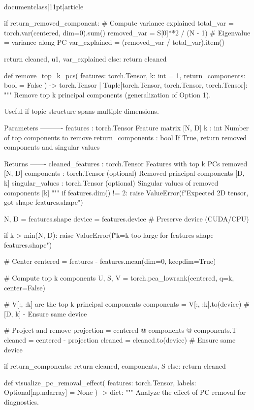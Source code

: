 \\documentclass[11pt]{article}
\begin{document}
\begin{CodeBlock}
{    if return_removed_component:
        # Compute variance explained
        total_var = torch.var(centered, dim=0).sum()
        removed_var = S[0]**2 / (N - 1)  # Eigenvalue = variance along PC
        var_explained = (removed_var / total_var).item()
        
        return cleaned, u1, var_explained
    else:
        return cleaned


def remove_top_k_pcs(
    features: torch.Tensor,
    k: int = 1,
    return_components: bool = False
) -> torch.Tensor | Tuple[torch.Tensor, torch.Tensor, torch.Tensor]:
    """
    Remove top k principal components (generalization of Option 1).
    
    Useful if topic structure spans multiple dimensions.
    
    Parameters
    ----------
    features : torch.Tensor
        Feature matrix [N, D]
    k : int
        Number of top components to remove
    return_components : bool
        If True, return removed components and singular values
    
    Returns
    -------
    cleaned_features : torch.Tensor
        Features with top k PCs removed [N, D]
    components : torch.Tensor (optional)
        Removed principal components [D, k]
    singular_values : torch.Tensor (optional)
        Singular values of removed components [k]
    """
    if features.dim() != 2:
        raise ValueError(f"Expected 2D tensor, got shape {features.shape}")
    
    N, D = features.shape
    device = features.device  # Preserve device (CUDA/CPU)
    
    if k > min(N, D):
        raise ValueError(f"k={k} too large for features shape {features.shape}")
    
    # Center
    centered = features - features.mean(dim=0, keepdim=True)
    
    # Compute top k components
    U, S, V = torch.pca_lowrank(centered, q=k, center=False)
    
    # V[:, :k] are the top k principal components
    components = V[:, :k].to(device)  # [D, k] - Ensure same device
    
    # Project and remove
    projection = centered @ components @ components.T
    cleaned = centered - projection
    cleaned = cleaned.to(device)  # Ensure same device
    
    if return_components:
        return cleaned, components, S
    else:
        return cleaned


def visualize_pc_removal_effect(
    features: torch.Tensor,
    labels: Optional[np.ndarray] = None
) -> dict:
    """
    Analyze the effect of PC removal for diagnostics.
    
}
\end{CodeBlock}
\end{document}
